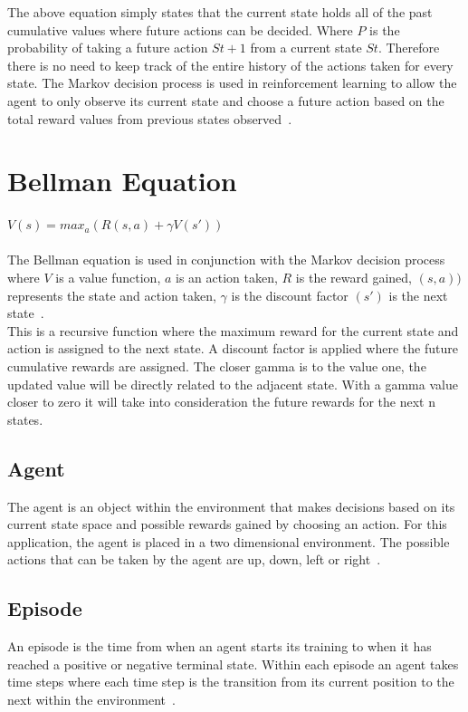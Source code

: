 The above equation simply states that the current state holds all of the past cumulative values where future actions can be decided.
Where $P$ is the probability of taking a future action $St+1$  from a current state $St$. Therefore there is no need to keep track of the entire history of the actions taken for every state. The Markov decision process is used in reinforcement learning to allow the agent to only observe its current state and choose a future action based on the total reward values from previous states observed~\cite[p.~67]{sutton_barto_2018}.

\section{Bellman Equation}
$V(s) = max_{a}(R(s,a)+\gamma V(s'))$\\\\

The Bellman equation is used in conjunction with the Markov decision process where $V$ is a value function, $a$ is an action taken, $R$ is the reward gained, $(s,a))$ represents the state and action taken, $\gamma$ is the discount factor $(s')$ is the next state~\cite[p.~75]{sutton_barto_2018}.
\\

This is a recursive function where the maximum reward for the current state and action is assigned to the next state. A discount factor is applied where the future cumulative rewards are assigned. The closer gamma is to the value one, the updated value will be directly related to the adjacent state. With a gamma value closer to zero it will take into consideration the future rewards for the next n states.
\subsection{Agent}
The agent is an object within the environment that makes decisions based on its current state space and possible rewards gained by choosing an action. For this application, the agent is placed in a two dimensional environment. The possible actions that can be taken by the agent are up, down, left or right~\cite{nwana_1996}.\\
\subsection{Episode}
An episode is the time from when an agent starts its training to when it has reached a positive or negative terminal state. Within each episode an agent takes time steps where each time step is the transition from its current position to the next within the environment~\cite{Watkins1992}.
